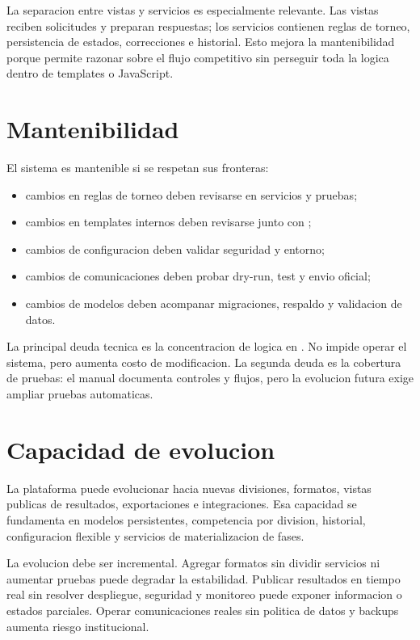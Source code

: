 La separacion entre vistas y servicios es especialmente relevante. Las vistas reciben solicitudes y preparan respuestas; los servicios contienen reglas de torneo, persistencia de estados, correcciones e historial. Esto mejora la mantenibilidad porque permite razonar sobre el flujo competitivo sin perseguir toda la logica dentro de templates o JavaScript.

\section{Mantenibilidad}
\label{sec:conclusiones-mantenibilidad}

El sistema es mantenible si se respetan sus fronteras:

\begin{itemize}
  \item cambios en reglas de torneo deben revisarse en servicios y pruebas;
  \item cambios en templates internos deben revisarse junto con ;
  \item cambios de configuracion deben validar seguridad y entorno;
  \item cambios de comunicaciones deben probar dry-run, test y envio oficial;
  \item cambios de modelos deben acompanar migraciones, respaldo y validacion de datos.
\end{itemize}

La principal deuda tecnica es la concentracion de logica en . No impide operar el sistema, pero aumenta costo de modificacion. La segunda deuda es la cobertura de pruebas: el manual documenta controles y flujos, pero la evolucion futura exige ampliar pruebas automaticas.

\section{Capacidad de evolucion}
\label{sec:conclusiones-evolucion}

La plataforma puede evolucionar hacia nuevas divisiones, formatos, vistas publicas de resultados, exportaciones e integraciones. Esa capacidad se fundamenta en modelos persistentes, competencia por division, historial, configuracion flexible y servicios de materializacion de fases.

La evolucion debe ser incremental. Agregar formatos sin dividir servicios ni aumentar pruebas puede degradar la estabilidad. Publicar resultados en tiempo real sin resolver despliegue, seguridad y monitoreo puede exponer informacion o estados parciales. Operar comunicaciones reales sin politica de datos y backups aumenta riesgo institucional.


